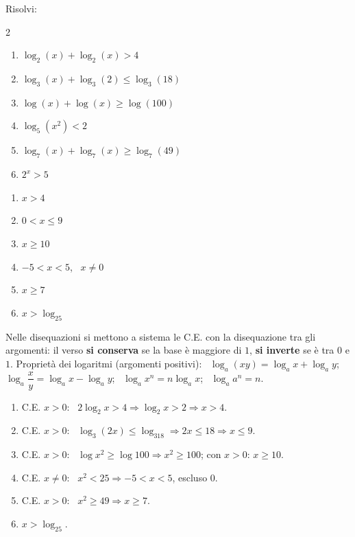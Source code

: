 
\begin{question}[ID=3.4, subtitle={Disequazioni logaritmiche con proprietà di somma}, difficulty=media, tags={disequazioni logaritmiche, proprietà}]
Risolvi:
\begin{center}\begin{minipage}{0.92\linewidth}
\begin{multicols}{2}
\begin{enumerate}[leftmargin=3.2cm]
\item $\log_2(x) + \log_2(x) > 4$
\item $\log_3(x) + \log_3(2) \le \log_3(18)$
\item $\log(x) + \log(x) \ge \log(100)$
\item $\log_5(x^2) < 2$
\item $\log_7(x) + \log_7(x) \ge \log_7(49)$
\item $2^x > 5$
\end{enumerate}
\end{multicols}
\end{minipage}\end{center}
\begin{solution}
\begin{enumerate}
    \item $x>4$
    \item $0<x\leq9$
    \item $x\geq10$
    \item $-5<x<5$, \ $x\neq0$
    \item $x\geq7$
    \item $x>\log_25$
\end{enumerate}
\end{solution}
\begin{explanation}
Nelle disequazioni si mettono a sistema le C.E. con la disequazione tra gli argomenti: il verso \textbf{si conserva} se la base è maggiore di $1$, \textbf{si inverte} se è tra $0$ e $1$.
Proprietà dei logaritmi (argomenti positivi): \ $\log_a(xy)=\log_ax+\log_ay$; \ $\log_a\dfrac xy=\log_ax-\log_ay$; \ $\log_a x^n=n\log_ax$; \ $\log_a a^n=n$.
\begin{enumerate}
    \item C.E. $x>0$: \ $2\log_2x>4 \Rightarrow \log_2x>2 \Rightarrow x>4$.
    \item C.E. $x>0$: \ $\log_3(2x)\leq\log_318 \Rightarrow 2x\leq18 \Rightarrow x\leq9$.
    \item C.E. $x>0$: \ $\log x^2\geq\log100 \Rightarrow x^2\geq100$; con $x>0$: $x\geq10$.
    \item C.E. $x\neq0$: \ $x^2<25 \Rightarrow -5<x<5$, escluso $0$.
    \item C.E. $x>0$: \ $x^2\geq49 \Rightarrow x\geq7$.
    \item $x>\log_25$.
\end{enumerate}
\end{explanation}
\end{question}

